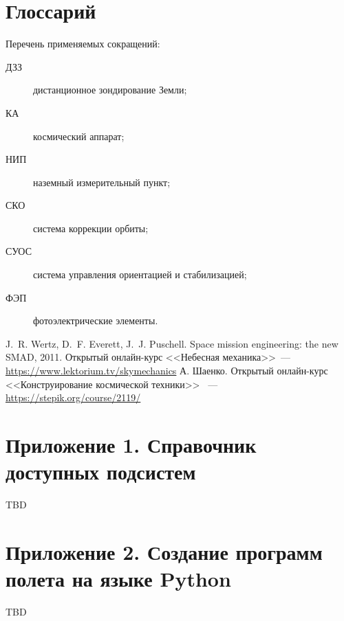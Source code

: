 \documentclass[12pt,a4paper]{article}
\begin{document}
\section*{Глоссарий}

Перечень применяемых сокращений:

\begin{description}
  \item[ДЗЗ] дистанционное зондирование Земли;
  \item[КА] космический аппарат;
  \item[НИП] наземный измерительный пункт;
  \item[СКО] система коррекции орбиты;
  \item[СУОС] система управления ориентацией и стабилизацией;
  \item[ФЭП] фотоэлектрические элементы.
\end{description}

\begin{thebibliography}{2}
 J.~R. Wertz, D.~F. Everett, J.~J. Puschell. Space mission
engineering: the new SMAD, 2011.
 Открытый онлайн-курс <<Небесная механика>>~---
  \url{https://www.lektorium.tv/skymechanics}
 А. Шаенко. Открытый онлайн-курс <<Конструирование космической техники>> ~---
  \url{https://stepik.org/course/2119/}
\end{thebibliography}

\section*{Приложение 1. Справочник доступных подсистем}
\label{Sec:Subsystems}

TBD

\section*{Приложение 2. Создание программ полета на языке Python}
\label{Sec:Python}

TBD
\end{document}
